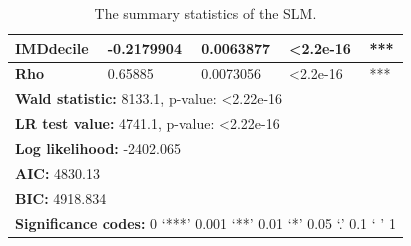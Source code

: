 \begin{table}[]
\begin{tabular}{|lllll|}
\multicolumn{1}{|l|}{IMDdecile}         & \multicolumn{1}{l|}{-0.2179904}           & \multicolumn{1}{l|}{0.0063877}           & \multicolumn{1}{l|}{\textless 2.2e-16} & ***                   \\ \hline \hline
\multicolumn{1}{|l|}{\textbf{Rho}}               & \multicolumn{1}{l|}{0.65885}              & \multicolumn{1}{l|}{0.0073056}           & \multicolumn{1}{l|}{\textless 2.2e-16} & ***                   \\ \hline \hline
\multicolumn{5}{|l|}{\textbf{Wald statistic:} 8133.1, p-value: \textless 2.22e-16}                                                                                                                       \\ \hline
\multicolumn{5}{|l|}{\textbf{LR test value:} 4741.1, p-value: \textless 2.22e-16}                                                                                                                        \\ \hline
\multicolumn{5}{|l|}{\textbf{Log likelihood:} -2402.065}                                                                                                                                                 \\ \hline
\multicolumn{5}{|l|}{\textbf{AIC:} 4830.13}                                                                                                                                                              \\ \hline
\multicolumn{5}{|l|}{\textbf{BIC:} 4918.834}                                                                                                                                                             \\ \hline \hline
\multicolumn{5}{|l|}{\textbf{Significance codes:} 0 ‘***’ 0.001 ‘**’ 0.01 ‘*’ 0.05 ‘.’ 0.1 ‘ ’ 1}                                                                                                        \\ \hline
\end{tabular}
\caption{
The summary statistics of the SLM.
}
\label{tab: A4.5}
\end{table}



